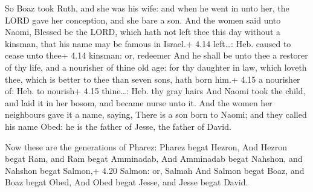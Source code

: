  So Boaz took Ruth, and she was his wife: and when he
went in unto her, the LORD gave her conception, and she bare a son.
 And the women said unto Naomi, Blessed be the LORD, which
hath not left thee this day without a kinsman, that his name may be
famous in Israel.+ 4.14 left\ldots: Heb. caused to cease unto thee+ 4.14
kinsman: or, redeemer  And he shall be unto thee a restorer
of thy life, and a nourisher of thine old age: for thy daughter in law,
which loveth thee, which is better to thee than seven sons, hath born
him.+ 4.15 a nourisher of: Heb. to nourish+ 4.15 thine\ldots: Heb. thy
gray hairs  And Naomi took the child, and laid it in her
bosom, and became nurse unto it.  And the women her
neighbours gave it a name, saying, There is a son born to Naomi; and
they called his name Obed: he is the father of Jesse, the father of
David.

 Now these are the generations of Pharez: Pharez begat
Hezron,  And Hezron begat Ram, and Ram begat Amminadab,
 And Amminadab begat Nahshon, and Nahshon begat Salmon,+
4.20 Salmon: or, Salmah  And Salmon begat Boaz, and Boaz
begat Obed,  And Obed begat Jesse, and Jesse begat David.
